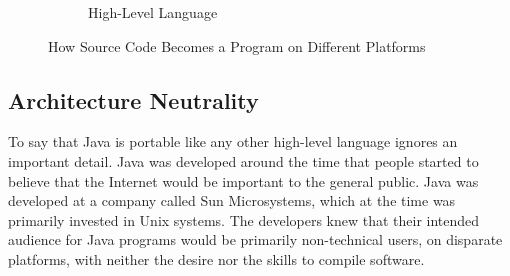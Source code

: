 \begin{figure}[ht]
\begin{subfigure}[c]{\textwidth}
\begin{center}
        \end{center}
    \caption{High-Level Language}
    \label{fig:high-level}
    \end{subfigure}
    \caption{How Source Code Becomes a Program on Different Platforms}
    \label{fig:become-program}
\end{figure}

\subsection{Architecture Neutrality}

To say that Java is portable like any other high-level language ignores an important detail.  Java was developed around the time that people started to believe that the Internet would be important to the general public.  Java was developed at a company called Sun Microsystems, which at the time was primarily invested in Unix systems.  The developers knew that their intended audience for Java programs would be primarily non-technical users, on disparate platforms, with neither the desire nor the skills to compile software.

